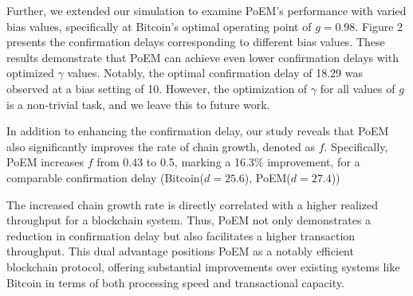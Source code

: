 Further, we extended our simulation to examine PoEM's performance with varied
bias values, specifically at Bitcoin's optimal operating point of $g=0.98$.
Figure 2 presents the confirmation delays corresponding to different bias
values. These results demonstrate that PoEM can achieve even lower confirmation
delays with optimized $\gamma$ values. Notably, the optimal confirmation delay
of 18.29 was observed at a bias setting of 10. However, the optimization of
$\gamma$ for all values of $g$ is a non-trivial task, and we leave this to
future work.

In addition to enhancing the confirmation delay, our study reveals that PoEM
also significantly improves the rate of chain growth, denoted as $f$.
Specifically, PoEM increases $f$ from 0.43 to 0.5, marking a 16.3\%
improvement, for a comparable confirmation delay (Bitcoin($d=25.6$),
PoEM($d=27.4$))

The increased chain growth rate is directly correlated with a higher realized
throughput for a blockchain system. Thus, PoEM not only demonstrates a
reduction in confirmation delay but also facilitates a higher transaction
throughput. This dual advantage positions PoEM as a notably efficient
blockchain protocol, offering substantial improvements over existing systems
like Bitcoin in terms of both processing speed and transactional capacity.

